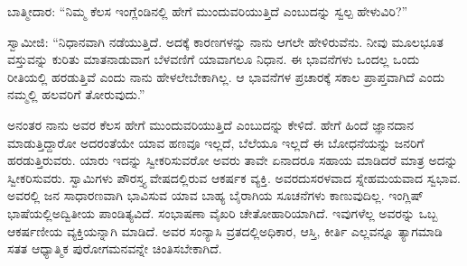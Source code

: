 \vskip 4pt

ಬಾತ್ಮೀದಾರ: “ನಿಮ್ಮ ಕೆಲಸ ಇಂಗ್ಲೆಂಡಿನಲ್ಲಿ ಹೇಗೆ ಮುಂದುವರಿಯುತ್ತಿದೆ ಎಂಬುದನ್ನು ಸ್ವಲ್ಪ ಹೇಳುವಿರಿ?”

\vskip 4pt

ಸ್ವಾಮೀಜಿ: “ನಿಧಾನವಾಗಿ ನಡೆಯುತ್ತಿದೆ. ಅದಕ್ಕೆ ಕಾರಣಗಳನ್ನು ನಾನು ಆಗಲೇ ಹೇಳಿರುವೆನು. ನೀವು ಮೂಲಭೂತ ವಸ್ತುವನ್ನು ಕುರಿತು ಮಾತನಾಡುವಾಗ ಬೆಳವಣಿಗೆ ಯಾವಾಗಲೂ ನಿಧಾನ. ಈ ಭಾವನೆಗಳು ಒಂದಲ್ಲ ಒಂದು ರೀತಿಯಲ್ಲಿ ಹರಡುತ್ತಿವೆ ಎಂದು ನಾನು ಹೇಳಲೇಬೇಕಾಗಿಲ್ಲ. ಆ ಭಾವನೆಗಳ ಪ್ರಚಾರಕ್ಕೆ ಸಕಾಲ ಪ್ರಾಪ್ತವಾಗಿದೆ ಎಂದು ನಮ್ಮಲ್ಲಿ ಹಲವರಿಗೆ ತೋರುವುದು.”

\vskip 4pt

ಅನಂತರ ನಾನು ಅವರ ಕೆಲಸ ಹೇಗೆ ಮುಂದುವರಿಯುತ್ತಿದೆ ಎಂಬುದನ್ನು ಕೇಳಿದೆ. ಹೇಗೆ ಹಿಂದೆ ಜ್ಞಾನದಾನ ಮಾಡುತ್ತಿದ್ದಾರೋ ಅದರಂತೆಯೇ ಯಾವ ಹಣವೂ ಇಲ್ಲದೆ, ಬೆಲೆಯೂ ಇಲ್ಲದೆ ಈ ಬೋಧನೆಯನ್ನು ಜನರಿಗೆ ಹರಡುತ್ತಿರುವರು. ಯಾರು ಇದನ್ನು ಸ್ವೀಕರಿಸುವರೋ ಅವರು ತಾವೇ ಏನಾದರೂ ಸಹಾಯ ಮಾಡಿದರೆ ಮಾತ್ರ ಅದನ್ನು ಸ್ವೀಕರಿಸುವರು. ಸ್ವಾಮಿಗಳು ಪೌರಸ್ತ್ಯ ವೇಷದಲ್ಲಿರುವ ಆಕರ್ಷಕ ವ್ಯಕ್ತಿ. ಅವರದು\break ಸರಳವಾದ ಸ್ನೇಹಮಯವಾದ ಸ್ವಭಾವ. ಅವರಲ್ಲಿ ಜನ ಸಾಧಾರಣವಾಗಿ ಭಾವಿಸುವ ಯಾವ ಬಾಹ್ಯ ಬೈರಾಗಿಯ ಸೂಚನೆಗಳು ಕಾಣುವುದಿಲ್ಲ. ಇಂಗ್ಲಿಷ್​ ಭಾಷೆಯಲ್ಲಿ\break ಅದ್ವಿತೀಯ ಪಾಂಡಿತ್ಯವಿದೆ. ಸಂಭಾಷಣಾ ವೈಖರಿ ಚೇತೋಹಾರಿಯಾಗಿದೆ. ಇವುಗಳೆಲ್ಲ ಅವರನ್ನು ಒಬ್ಬ ಆಕರ್ಷಣೀಯ ವ್ಯಕ್ತಿಯನ್ನಾಗಿ ಮಾಡಿದೆ. ಅವರ ಸಂನ್ಯಾಸಿ ವ್ರತದಲ್ಲಿ\break ಅಧಿಕಾರ, ಆಸ್ತಿ, ಕೀರ್ತಿ ಎಲ್ಲವನ್ನೂ ತ್ಯಾಗಮಾಡಿ ಸತತ ಆಧ್ಯಾತ್ಮಿಕ ಪುರೋಗಮನವನ್ನೇ ಚಿಂತಿಸಬೇಕಾಗಿದೆ.

